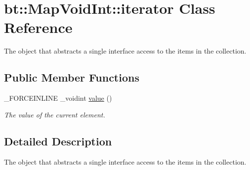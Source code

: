 \hypertarget{classbt_1_1_map_void_int_1_1iterator}{\section{bt\-:\-:Map\-Void\-Int\-:\-:iterator Class Reference}
\label{classbt_1_1_map_void_int_1_1iterator}
}


The object that abstracts a single interface access to the items in the collection.  


\subsection*{Public Member Functions}
\begin{DoxyCompactItemize}
\item 
\hypertarget{classbt_1_1_map_void_int_1_1iterator_a8f4327f1263c134f675e4698b0e8e6e6}{\-\_\-\-F\-O\-R\-C\-E\-I\-N\-L\-I\-N\-E \-\_\-voidint \hyperlink{classbt_1_1_map_void_int_1_1iterator_a8f4327f1263c134f675e4698b0e8e6e6}{value} ()}\label{classbt_1_1_map_void_int_1_1iterator_a8f4327f1263c134f675e4698b0e8e6e6}

\begin{DoxyCompactList}\small\item\em The value of the current element. \end{DoxyCompactList}\end{DoxyCompactItemize}


\subsection{Detailed Description}
The object that abstracts a single interface access to the items in the collection. 